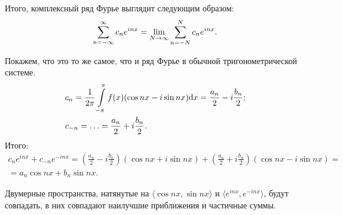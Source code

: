 \documentclass[a4paper, 12pt]{article}
\begin{document}
Итого, комплексный ряд Фурье выглядит следующим образом:
$$
\sum\limits_{n=-\infty}^{\infty} c_n e^{inx}  = \lim\limits_{N \to \infty} \sum\limits_{n=-N}^{N} c_n e^{inx}.
$$

Покажем, что это то же самое, что и ряд Фурье в обычной тригонометрической системе.
\begin{align*}
& c_n = \frac{1}{2\pi}  \int\limits_{-\pi}^{\pi} f(x) (\cos nx - i\sin nx) \mathrm{d} x = \frac{a_n}{2} - i \frac{b_n}{2};\\
& c_{-n} = \ldots = \frac{a_n}{2} + i \frac{b_n}{2}.
\end{align*}
Итого:
\begin{gather*}
c_n e^{inx} + c_{-n} e^{-inx} = \left( \frac{a_n}{2} - i\frac{b_n}{2} \right)(\cos nx + i\sin nx) + \left( \frac{a_n}{2} + i\frac{b_n}{2} \right)(\cos nx - i\sin nx) =\\= a_n \cos nx + b_n \sin nx.
\end{gather*}

Двумерные пространства, натянутые на $\langle \cos nx , \sin nx \rangle$ и $\langle e^{inx}, e^{-inx} \rangle$, будут совпадать, в них совпадают наилучшие приближения и частичные суммы.
\end{document}

